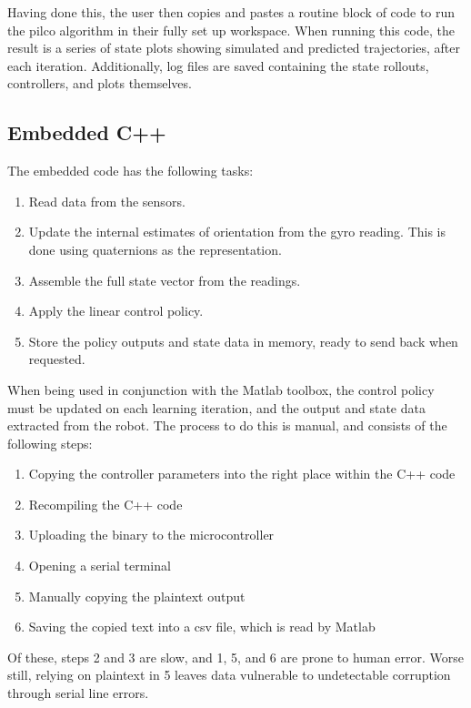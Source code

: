 \documentclass[main.tex]{subfiles}
\begin{document}
	Having done this, the user then copies and pastes a routine block of code to run the pilco algorithm in their fully set up workspace.
	When running this code, the result is a series of state plots showing simulated and predicted trajectories, after each iteration.
	Additionally, log files are saved containing the state rollouts, controllers, and plots themselves.

	\subsection{Embedded C++}

	The embedded code has the following tasks:
	\begin{enumerate}[noitemsep]
		\item Read data from the sensors.
		\item
			Update the internal estimates of orientation from the gyro reading.
			This is done using quaternions as the representation.
		\item Assemble the full state vector from the readings.
		\item Apply the linear control policy.
		\item Store the policy outputs and state data in memory, ready to send back when requested.
	\end{enumerate}
	When being used in conjunction with the Matlab toolbox, the control policy must be updated on each learning iteration, and the output and state data extracted from the robot.
	The process to do this is manual, and consists of the following steps:
	\begin{enumerate}[noitemsep]
		\item Copying the controller parameters into the right place within the C++ code
		\item Recompiling the C++ code
		\item Uploading the binary to the microcontroller
		\item Opening a serial terminal
		\item Manually copying the plaintext output
		\item Saving the copied text into a csv file, which is read by Matlab
	\end{enumerate}
	Of these, steps 2 and 3 are slow, and 1, 5, and 6 are prone to human error.
	Worse still, relying on plaintext in 5 leaves data vulnerable to undetectable corruption through serial line errors\footnotemark.

\end{document}
